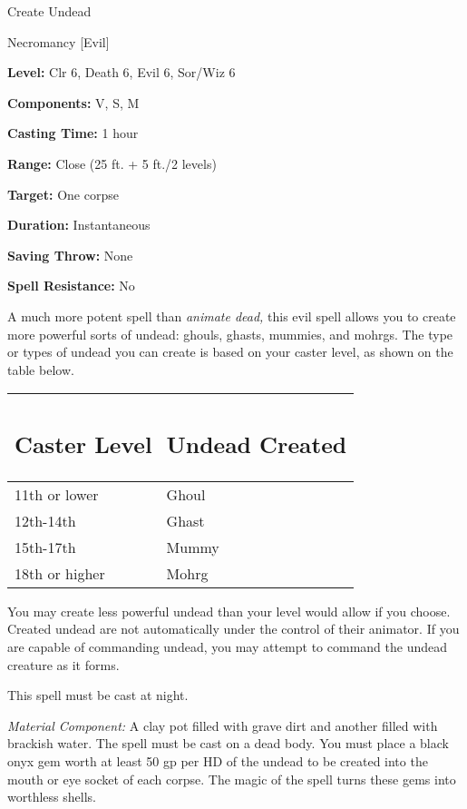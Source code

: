 \documentclass{article}
\begin{document}
\vspace{12pt}
Create Undead

Necromancy [Evil]

\textbf{Level:} Clr 6, Death 6, Evil 6, Sor/Wiz 6

\textbf{Components:} V, S, M

\textbf{Casting Time:} 1 hour

\textbf{Range:} Close (25 ft. + 5 ft./2 levels)

\textbf{Target:} One corpse

\textbf{Duration:} Instantaneous

\textbf{Saving Throw:} None

\textbf{Spell Resistance:} No

A much more potent spell than \textit{animate dead, }this evil spell allows you 
to create more powerful sorts of undead: ghouls, ghasts, mummies, and mohrgs. The 
type or types of undead you can create is based on your caster level, as shown 
on the table below.

\begin{tabular}{|>{\raggedright}p{55pt}|>{\raggedright}p{69pt}|}
\hline
\subsection*{C\textbf{aster Level}} & \subsection*{U\textbf{ndead Created}}\tabularnewline
\hline
11th or lower & Ghoul\tabularnewline
\hline
12th-14th & Ghast\tabularnewline
\hline
15th-17th & Mummy\tabularnewline
\hline
18th or higher & Mohrg\tabularnewline
\hline
\end{tabular}

You may create less powerful undead than your level would allow if you choose. 
Created undead are not automatically under the control of their animator. If you 
are capable of commanding undead, you may attempt to command the undead creature 
as it forms.

This spell must be cast at night.

\textit{Material Component: }A clay pot filled with grave dirt and another filled 
with brackish water. The spell must be cast on a dead body. You must place a black 
onyx gem worth at least 50 gp per HD of the undead to be created into the mouth 
or eye socket of each corpse. The magic of the spell turns these gems into worthless 
shells.
\end{document}
